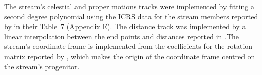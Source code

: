 The stream's celestial and proper motions tracks were implemented by fitting a second degree polynomial using the ICRS data for the stream members reported by \citet{Shipp2019} in their Table~7 (Appendix E). The distance track was implemented by a linear interpolation between the end points and distances reported in \citet{Shipp2018}.The stream's coordinate frame is implemented from the coefficients for the rotation matrix reported by \citet{Li2018}, which makes the origin of the coordinate frame centred on the stream's progenitor.
